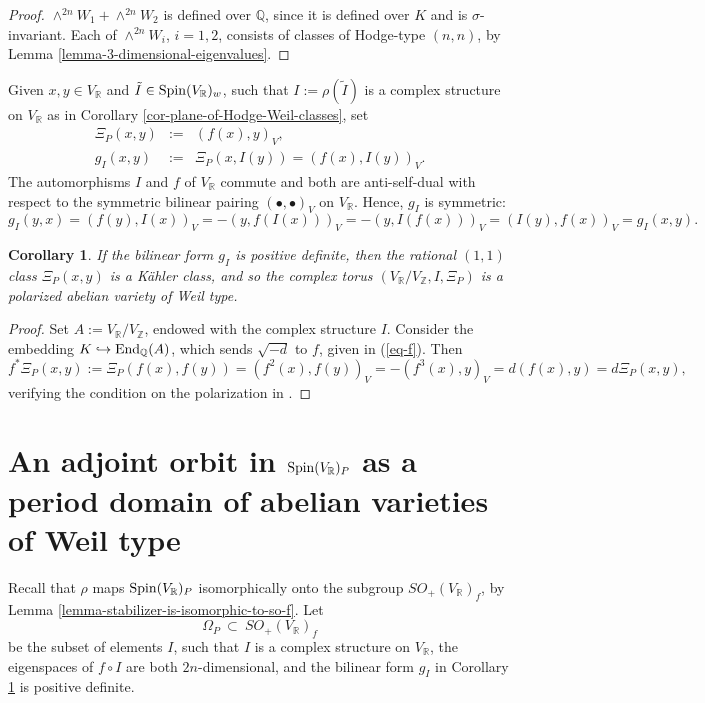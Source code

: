 \documentclass[12pt]{amsart}
\numberwithin{equation}{subsection}
\theoremstyle{plain}
\newtheorem{cor}[thm]{Corollary}
\theoremstyle{definition}
\newcommand{\QQ}{{\mathbb Q}}
\newcommand{\RR}{{\mathbb R}}
\newcommand{\ZZ}{{\mathbb Z}}
\newcommand{\Spin}{{\rm Spin}}
\newcommand{\End}{{\rm End}}
\begin{document}
\begin{proof}
$\wedge^{2n}W_1+\wedge^{2n}W_2$ is defined over $\QQ$, since it is defined over $K$ and is $\sigma$-invariant.
Each of $\wedge^{2n}W_i$, $i=1,2$, consists of classes of Hodge-type $(n,n)$, by Lemma \ref{lemma-3-dimensional-eigenvalues}.
\end{proof}

Given $x,y\in V_\RR$ and $\tilde{I}\in \Spin(V_\RR)_w$, such that $I:=\rho(\tilde{I})$ is a complex structure on $V_\RR$ as in Corollary \ref{cor-plane-of-Hodge-Weil-classes}, set 
\begin{eqnarray*}
\Xi_P(x,y)&:=&(f(x),y)_V,
\\
g_I(x,y)&:=& \Xi_P(x,I(y))=(f(x),I(y))_V.
\end{eqnarray*}
The automorphisms  $I$ and $f$ of $V_\RR$ commute and both are anti-self-dual with respect to the symmetric bilinear pairing $(\bullet,\bullet)_V$ on $V_\RR$. Hence, $g_I$ is symmetric:
\[
g_I(y,x)=(f(y),I(x))_V=-(y,f(I(x)))_V=-(y,I(f(x)))_V=(I(y),f(x))_V
=g_I(x,y).
\]

\begin{cor}
\label{cor-abelian-variety-of-weil-type}
If the bilinear form $g_I$ is positive definite, then the rational $(1,1)$ class $\Xi_P(x,y)$ is a K\"{a}hler class, and so the complex torus $(V_\RR/V_\ZZ,I,\Xi_P)$ is a polarized abelian variety of Weil type.
\end{cor}

\begin{proof}
Set $A:=V_\RR/V_\ZZ$, endowed with the complex structure $I$.
Consider the embedding $K\hookrightarrow \End_\QQ(A)$, which sends $\sqrt{-d}$ to $f$, given in (\ref{eq-f}).
Then 
\[
f^*\Xi_P(x,y):=\Xi_P(f(x),f(y))=(f^2(x),f(y))_V=-(f^3(x),y)_V=d(f(x),y)=d\Xi_P(x,y),
\]
verifying the condition on the polarization in \cite[Def. 4.9]{van-Geemen}.
\end{proof}

% 
\section{An adjoint orbit in  $\Spin(V_\RR)_P$ as a period domain of abelian varieties of Weil type}
\label{sec-period-domains}
Recall that $\rho$ maps $\Spin(V_\RR)_P$ isomorphically onto the subgroup $SO_+(V_\RR)_f$, by Lemma \ref{lemma-stabilizer-is-isomorphic-to-so-f}.
Let 
\begin{equation}
\label{eq-Omega}
\Omega_P \ \subset \ SO_+(V_\RR)_f
\end{equation} be the subset of elements $I$, such that $I$ is a complex structure on $V_\RR$, the eigenspaces of $f\circ I$ are both $2n$-dimensional,  and the bilinear form $g_I$ in Corollary \ref{cor-abelian-variety-of-weil-type} is positive definite. 
\end{document}

